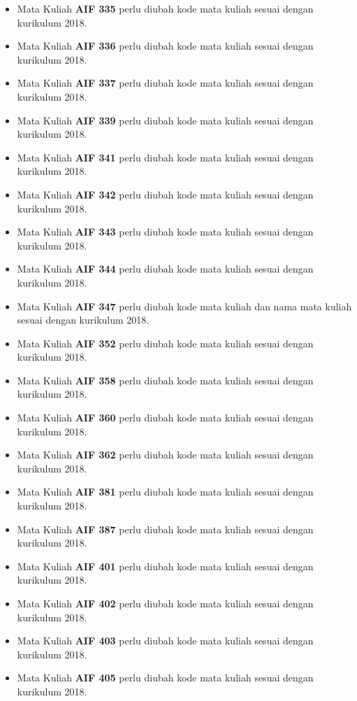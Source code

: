 \begin{enumerate}
\begin{itemize}
		\item Mata Kuliah \textbf{AIF 335} perlu diubah kode mata kuliah sesuai dengan kurikulum 2018.
		\item Mata Kuliah \textbf{AIF 336} perlu diubah kode mata kuliah sesuai dengan kurikulum 2018.
		\item Mata Kuliah \textbf{AIF 337} perlu diubah kode mata kuliah sesuai dengan kurikulum 2018.
		\item Mata Kuliah \textbf{AIF 339} perlu diubah kode mata kuliah sesuai dengan kurikulum 2018.
		\item Mata Kuliah \textbf{AIF 341} perlu diubah kode mata kuliah sesuai dengan kurikulum 2018.
		\item Mata Kuliah \textbf{AIF 342} perlu diubah kode mata kuliah sesuai dengan kurikulum 2018.
		\item Mata Kuliah \textbf{AIF 343} perlu diubah kode mata kuliah sesuai dengan kurikulum 2018.
		\item Mata Kuliah \textbf{AIF 344} perlu diubah kode mata kuliah sesuai dengan kurikulum 2018.
		\item Mata Kuliah \textbf{AIF 347} perlu diubah kode mata kuliah dan nama mata kuliah sesuai dengan kurikulum 2018.
		\item Mata Kuliah \textbf{AIF 352} perlu diubah kode mata kuliah sesuai dengan kurikulum 2018.
		\item Mata Kuliah \textbf{AIF 358} perlu diubah kode mata kuliah sesuai dengan kurikulum 2018.
		\item Mata Kuliah \textbf{AIF 360} perlu diubah kode mata kuliah sesuai dengan kurikulum 2018.
		\item Mata Kuliah \textbf{AIF 362} perlu diubah kode mata kuliah sesuai dengan kurikulum 2018.
		\item Mata Kuliah \textbf{AIF 381} perlu diubah kode mata kuliah sesuai dengan kurikulum 2018.
		\item Mata Kuliah \textbf{AIF 387} perlu diubah kode mata kuliah sesuai dengan kurikulum 2018.
		\item Mata Kuliah \textbf{AIF 401} perlu diubah kode mata kuliah sesuai dengan kurikulum 2018.
		\item Mata Kuliah \textbf{AIF 402} perlu diubah kode mata kuliah sesuai dengan kurikulum 2018.
		\item Mata Kuliah \textbf{AIF 403} perlu diubah kode mata kuliah sesuai dengan kurikulum 2018.
		\item Mata Kuliah \textbf{AIF 405} perlu diubah kode mata kuliah sesuai dengan kurikulum 2018.

\end{itemize}
\end{enumerate}
